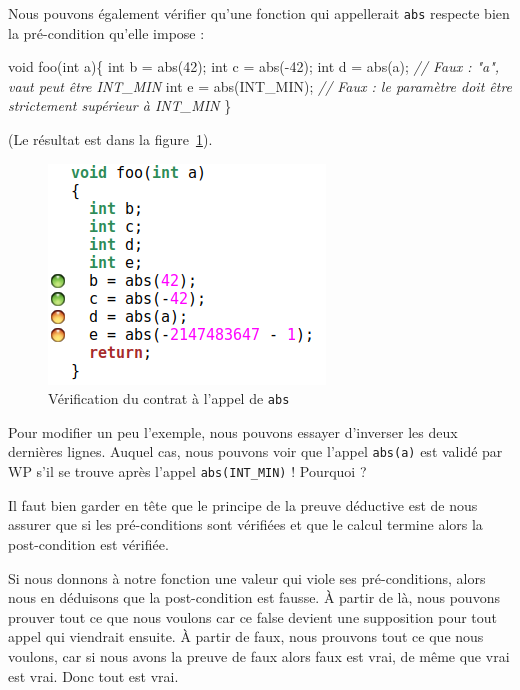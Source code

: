 \documentclass[12pt,francais,]{scrbook}
\newenvironment{Shaded}{}{}
\newcommand{\DataTypeTok}[1]{\textcolor[rgb]{0.56,0.13,0.00}{{#1}}}
\newcommand{\DecValTok}[1]{\textcolor[rgb]{0.25,0.63,0.44}{{#1}}}
\newcommand{\CommentTok}[1]{\textcolor[rgb]{0.38,0.63,0.69}{\textit{{#1}}}}
\newcommand{\NormalTok}[1]{{#1}}
\begin{document}
Nous pouvons également vérifier qu'une fonction qui appellerait
\texttt{abs} respecte bien la pré-condition qu'elle impose :

\begin{footnotesize}\begin{Shaded}
\begin{Highlighting}[]
\DataTypeTok{void} \NormalTok{foo(}\DataTypeTok{int} \NormalTok{a)\{}
   \DataTypeTok{int} \NormalTok{b = abs(}\DecValTok{42}\NormalTok{);}
   \DataTypeTok{int} \NormalTok{c = abs(-}\DecValTok{42}\NormalTok{);}
   \DataTypeTok{int} \NormalTok{d = abs(a);       }\CommentTok{// Faux : "a", vaut peut être INT_MIN}
   \DataTypeTok{int} \NormalTok{e = abs(INT_MIN); }\CommentTok{// Faux : le paramètre doit être strictement supérieur à INT_MIN}
\NormalTok{\}}
\end{Highlighting}
\end{Shaded}\end{footnotesize}

(Le résultat est dans la figure~\ref{fig:2-1-2-foo-1}).

\begin{figure}[htbp]
\centering
\includegraphics[scale=0.5]{2-1-2-foo-1.png}
\caption{Vérification du contrat à l'appel de \texttt{abs}}
\label{fig:2-1-2-foo-1}
\end{figure}

Pour modifier un peu l'exemple, nous pouvons essayer d'inverser les deux
dernières lignes. Auquel cas, nous pouvons voir que l'appel
\texttt{abs(a)} est validé par WP s'il se trouve après l'appel
\texttt{abs(INT\_MIN)} ! Pourquoi ?

Il faut bien garder en tête que le principe de la preuve déductive est
de nous assurer que si les pré-conditions sont vérifiées et que le
calcul termine alors la post-condition est vérifiée.

Si nous donnons à notre fonction une valeur qui viole ses
pré-conditions, alors nous en déduisons que la post-condition est
fausse. À partir de là, nous pouvons prouver tout ce que nous voulons
car ce \og{}false\fg{} devient une supposition pour tout appel qui viendrait
ensuite. À partir de faux, nous prouvons tout ce que nous voulons, car
si nous avons la preuve de \og{}faux\fg{} alors \og{}faux\fg{} est vrai, de même que
\og{}vrai\fg{} est vrai. Donc tout est vrai.
\end{document}
